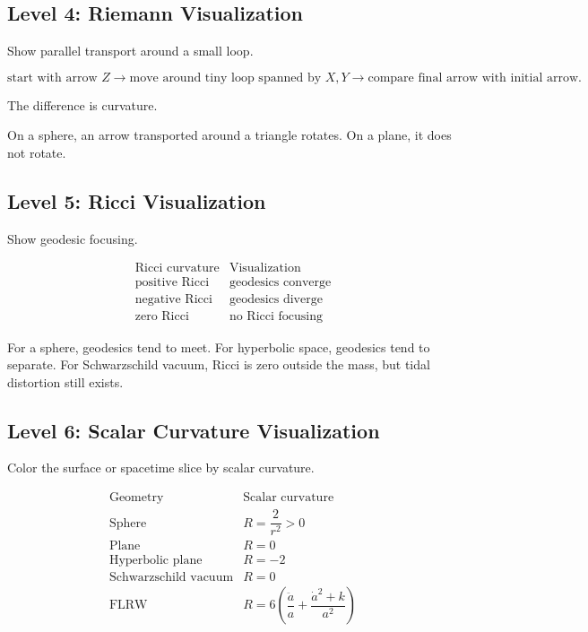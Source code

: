 \documentclass[12pt,a4paper]{article}
\theoremstyle{notespace}
\begin{document}
\subsection{Level 4: Riemann Visualization}

Show parallel transport around a small loop.

\[
\text{start with arrow }Z
\longrightarrow
\text{move around tiny loop spanned by }X,Y
\longrightarrow
\text{compare final arrow with initial arrow}.
\]

The difference is curvature.

On a sphere, an arrow transported around a triangle rotates. On a plane, it does not rotate.

\subsection{Level 5: Ricci Visualization}

Show geodesic focusing.

\[
\begin{array}{c|c}
	\text{Ricci curvature} & \text{Visualization}\\
	\hline
	\text{positive Ricci} & \text{geodesics converge}\\
	\text{negative Ricci} & \text{geodesics diverge}\\
	\text{zero Ricci} & \text{no Ricci focusing}
\end{array}
\]

For a sphere, geodesics tend to meet. For hyperbolic space, geodesics tend to separate. For Schwarzschild vacuum, Ricci is zero outside the mass, but tidal distortion still exists.

\subsection{Level 6: Scalar Curvature Visualization}

Color the surface or spacetime slice by scalar curvature.

\[
\begin{array}{c|c}
	\text{Geometry} & \text{Scalar curvature}\\
	\hline
	\text{Sphere} & R=\dfrac2{r^2}>0\\
	\text{Plane} & R=0\\
	\text{Hyperbolic plane} & R=-2\\
	\text{Schwarzschild vacuum} & R=0\\
	\text{FLRW} &
	R=
	6\left(
	\dfrac{\ddot a}{a}
	+
	\dfrac{\dot a^2+k}{a^2}
	\right)
\end{array}
\]
\end{document}
